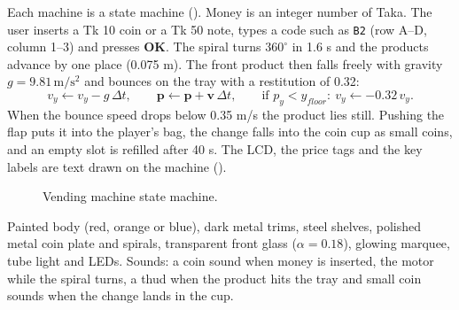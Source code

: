  Each machine is a state machine (). Money is an integer number of Taka.
The user inserts a Tk 10 coin or a Tk 50 note, types a code such as \texttt{B2} (row A--D, column 1--3) and
presses \textbf{OK}. The spiral turns $360^\circ$ in 1.6 s and the products advance by one place (0.075 m).
The front product then falls freely with gravity $g=9.81\,\mathrm{m/s^2}$ and bounces on the tray with a
restitution of 0.32:
\[
v_y \leftarrow v_y - g\,\Delta t,\qquad \mathbf{p}\leftarrow\mathbf{p}+\mathbf{v}\,\Delta t,\qquad
\text{if } p_y < y_{floor}:\ v_y \leftarrow -0.32\,v_y .
\]
When the bounce speed drops below 0.35 m/s the product lies still. Pushing the flap puts it into the
player's bag, the change falls into the coin cup as small coins, and an empty slot is refilled after 40 s.
The LCD, the price tags and the key labels are text drawn on the machine ().
\begin{figure}[H]
\centering
{}
\caption{Vending machine state machine.}\label{fig:vendsm}
\end{figure}
 Painted body (red, orange or blue), dark metal trims, steel shelves,
polished metal coin plate and spirals, transparent front glass ($\alpha=0.18$), glowing marquee, tube light
and LEDs. Sounds: a coin sound when money is inserted, the motor while the spiral turns, a thud when the
product hits the tray and small coin sounds when the change lands in the cup.

